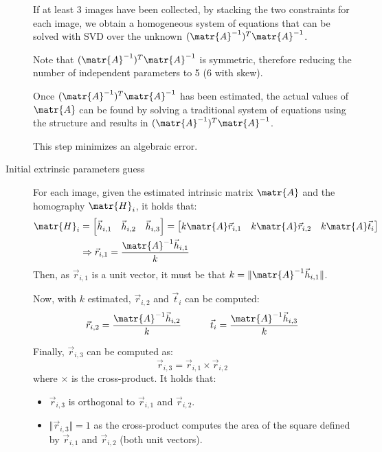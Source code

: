 \begin{description}
        If at least 3 images have been collected, by stacking the two constraints for each image,
        we obtain a homogeneous system of equations that can be solved with SVD over the unknown $(\matr{A}^{-1})^T \matr{A}^{-1}$.

        Note that $(\matr{A}^{-1})^T \matr{A}^{-1}$ is symmetric, therefore reducing the number of independent parameters to 5 (6 with skew).

        Once $(\matr{A}^{-1})^T \matr{A}^{-1}$ has been estimated, the actual values of $\matr{A}$ can be found by solving a 
        traditional system of equations using the structure and results in $(\matr{A}^{-1})^T \matr{A}^{-1}$.

        \begin{remark}
            This step minimizes an algebraic error.
        \end{remark}

    \item[Initial extrinsic parameters guess]
        For each image, given the estimated intrinsic matrix $\matr{A}$ and the homography $\matr{H}_i$,
        it holds that:
        \[
            \begin{split}
                \matr{H}_i &= \begin{bmatrix} \vec{h}_{i,1} & \vec{h}_{i,2} & \vec{h}_{i,3} \end{bmatrix} =
                    \begin{bmatrix} k\matr{A}\vec{r}_{i,1} & k\matr{A}\vec{r}_{i,2} & k\matr{A}\vec{t}_{i} \end{bmatrix} \\
                    &\Rightarrow \vec{r}_{i,1} = \frac{\matr{A}^{-1} \vec{h}_{i,1}}{k} 
            \end{split}  
        \]
        Then, as $\vec{r}_{i,1}$ is a unit vector, it must be that $k = \Vert \matr{A}^{-1} \vec{h}_{i,1} \Vert$.

        Now, with $k$ estimated, $\vec{r}_{i,2}$ and $\vec{t}_{i}$ can be computed:
        \[ \vec{r}_{i,2} = \frac{\matr{A}^{-1}\vec{h}_{i,2}}{k} \hspace{3em} \vec{t}_{i} = \frac{\matr{A}^{-1}\vec{h}_{i,3}}{k} \]

        Finally, $\vec{r}_{i,3}$ can be computed as:
        \[ \vec{r}_{i,3} = \vec{r}_{i,1} \times \vec{r}_{i,2} \]
        where $\times$ is the cross-product. It holds that:
        \begin{itemize}
            \item $\vec{r}_{i,3}$ is orthogonal to $\vec{r}_{i,1}$ and $\vec{r}_{i,2}$.
            \item $\Vert \vec{r}_{i,3} \Vert = 1$ as the cross-product computes the area of the square defined by $\vec{r}_{i,1}$ and $\vec{r}_{i,2}$ (both unit vectors).
        \end{itemize}


\end{description}
